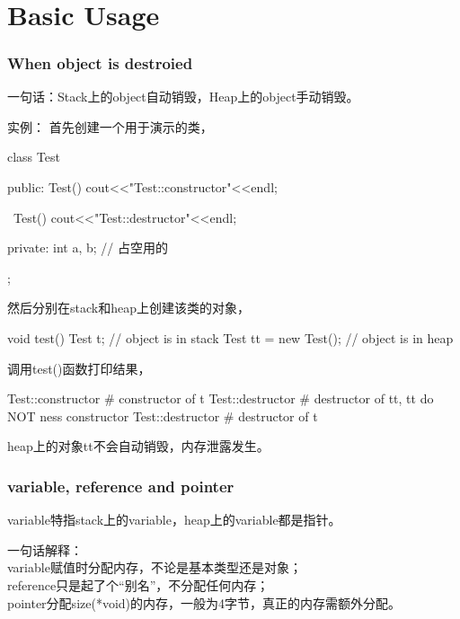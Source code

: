 \documentclass[a4paper,11pt]{article}
\begin{document}
\tt %
\pagestyle{header}
\sybmaketitle
\tableofcontents
\newpage

\pagestyle{main}
\setcounter{page}{1}

\part[Basic Usage]{Basic Usage}
\section[When destroy object]{When object is destroied}
一句话：Stack上的object自动销毁，Heap上的object手动销毁。

实例：
首先创建一个用于演示的类，\\
\begin{cppcode}
class Test {
public:
    Test() {
      cout<<"Test::constructor"<<endl;
    }

    ~Test() {
      cout<<"Test::destructor"<<endl;
    }

private:
    int a, b; // 占空用的
};
\end{cppcode}

然后分别在stack和heap上创建该类的对象，

\begin{cppcode}
void test() {
    Test t; // object is in stack
    Test tt = new Test(); // object is in heap
}
\end{cppcode}

调用test()函数打印结果，

\begin{bashcode}
Test::constructor # constructor of t
Test::destructor # destructor of tt, tt do NOT ness constructor
Test::destructor  # destructor of t
\end{bashcode}

heap上的对象tt不会自动销毁，内存泄露发生。

\section[variable, reference and pointer]{variable, reference and pointer}
variable特指stack上的variable，heap上的variable都是指针。

一句话解释：\\
variable赋值时分配内存，不论是基本类型还是对象；\\
reference只是起了个“别名”，不分配任何内存；\\
pointer分配size(*void)的内存，一般为4字节，真正的内存需额外分配。
\end{document}
